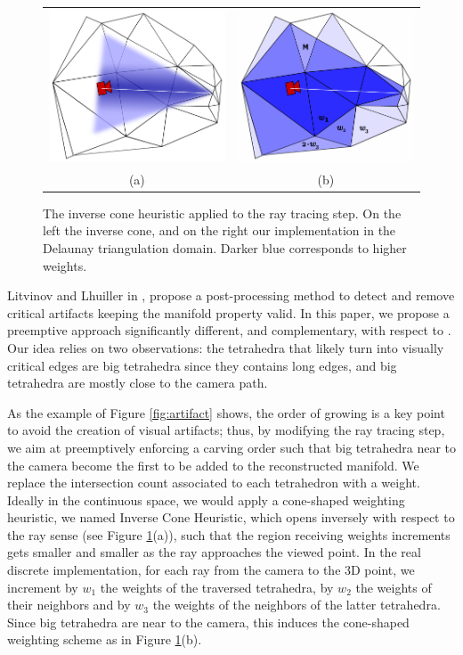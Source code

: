 \begin{figure}
\centering
\begin{tabular}{cc}
\includegraphics[width=0.35\columnwidth]{./img/ch-incr-manif/conicCarvingOKCont}&
\includegraphics[width=0.35\columnwidth]{./img//conicCarvingOK}\\
(a) & (b)
\end{tabular}
\caption{The inverse cone heuristic applied to the ray tracing step. On the left the inverse cone, and on the right our implementation in the Delaunay triangulation domain. Darker blue corresponds to higher weights.}
\label{fig:ConicCarving}
\end{figure}



Litvinov and Lhuiller in \cite{litvinov_Lhiuller14}, propose a post-processing method to detect and remove critical artifacts keeping the manifold property valid.
In this paper, we propose a preemptive approach significantly different, and complementary, with respect to \cite{litvinov_Lhiuller14}. 
Our idea relies on two observations: the tetrahedra that likely turn into visually critical edges are big tetrahedra since they contains long edges, and big tetrahedra are mostly close to the camera path.





As the example of Figure \ref{fig:artifact} shows, the order of growing is a key point to avoid the creation of visual artifacts; thus,
 by modifying the ray tracing step, we aim at preemptively enforcing a carving order such that big tetrahedra near to the camera become the first to be added to the reconstructed manifold.
We replace the intersection count associated to each tetrahedron with a weight. Ideally in the continuous space, we would apply  a cone-shaped weighting heuristic, we named Inverse Cone Heuristic, which opens inversely with respect to the ray sense (see Figure \ref{fig:ConicCarving}(a)),  such that the region receiving weights increments gets smaller and smaller as the ray approaches the viewed point.
In the real discrete implementation, for each ray from the camera to the 3D point, we increment by $w_1$ the weights of the traversed tetrahedra, by $w_2$ the weights of their neighbors and by $w_3$ the weights of the neighbors of the latter tetrahedra.
Since big tetrahedra are near to the camera, this induces the cone-shaped weighting scheme as in Figure \ref{fig:ConicCarving}(b).


